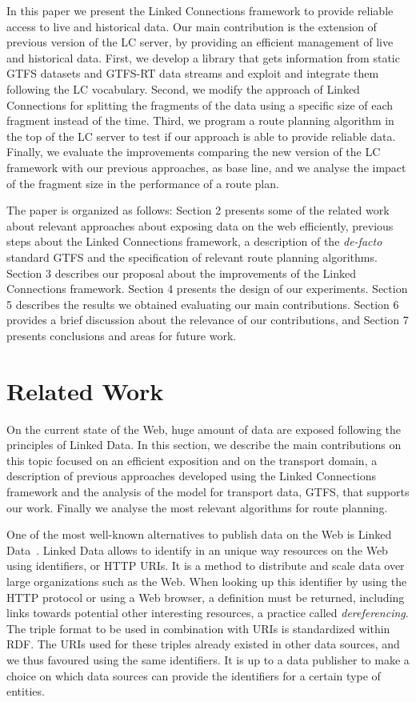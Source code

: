 \documentclass[sw]{iosart2x}
\begin{document}
In this paper we present the Linked Connections framework to provide reliable access to live and historical data. Our main contribution is the extension of previous version of the LC server, by providing an efficient management of live and historical data. First, we develop a library that gets information from static GTFS datasets and GTFS-RT data streams and exploit and integrate them following the LC vocabulary. Second, we modify the approach of Linked Connections for splitting the fragments of the data using a specific size of each fragment instead of the time. Third, we program a route planning algorithm in the top of the LC server to test if our approach is able to provide reliable data. Finally, we evaluate the improvements comparing the new version of the LC framework with our previous approaches, as base line, and we analyse the impact of the fragment size in the performance of a route plan.

The paper is organized as follows: Section 2 presents some of the related work about relevant approaches about exposing data on the web efficiently,  previous steps about the Linked Connections framework, a description of the \textit{de-facto} standard GTFS and the specification of relevant route planning algorithms. Section 3 describes our proposal about the improvements of the Linked Connections framework. Section 4 presents the design of our experiments. Section 5 describes the results we obtained evaluating our main contributions. Section 6 provides a brief discussion about the relevance of our contributions, and Section 7 presents conclusions and areas for future work.


\section{Related Work}\label{related_work} %
On the current state of the Web, huge amount of data are exposed following the principles of Linked Data. In this section, we describe the main contributions on this topic focused on an efficient exposition and on the transport domain, a description of previous approaches developed using the Linked Connections framework and the analysis of the model for transport data, GTFS, that supports our work. Finally we analyse the most relevant algorithms for route planning.

One of the most well-known alternatives to publish data on the Web is Linked Data~\cite{bizer2009linked}. Linked Data allows to identify in an unique way resources on the Web using identifiers, or HTTP URIs. It is a method to distribute and scale data over large organizations such as the Web. When looking up this identifier by using the HTTP protocol or using a Web browser, a definition must be returned, including links towards potential other interesting resources, a practice called \textit{dereferencing}. The triple format to be used in combination with URIs is standardized within RDF. The URIs used for these triples already existed in other data sources, and we thus favoured using the same identifiers. It is up to a data publisher to make a choice on which data sources can provide the identifiers for a certain type of entities. 
\end{document}
